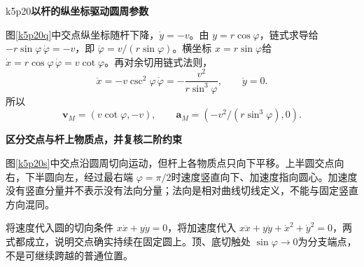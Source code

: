 \begin{drillsolution}{k5p20}\textbf{以杆的纵坐标驱动圆周参数}\par\nobreak
图\ref{k5p20q}中交点纵坐标随杆下降，$\dot y=-v$。由 $y=r\cos\varphi$，链式求导给 $-r\sin\varphi\,\dot\varphi=-v$，即 $\dot\varphi=v/(r\sin\varphi)$。横坐标 $x=r\sin\varphi$给 $\dot x=r\cos\varphi\,\dot\varphi=v\cot\varphi$。再对余切用链式法则，
\[\ddot x=-v\csc^2\varphi\,\dot\varphi
 =-\frac{v^2}{r\sin^3\varphi},\qquad\ddot y=0.\]
所以
\[\boxed{\bm v_M=(v\cot\varphi,-v)},\qquad\boxed{\bm a_M=(-v^2/(r\sin^3\varphi),0)}.\]



\par\medskip{}\noindent\textbf{区分交点与杆上物质点，并复核二阶约束}\par\nobreak
图\ref{k5p20s}中交点沿圆周切向运动，但杆上各物质点只向下平移。上半圆交点向右，下半圆向左，经过最右端 $\varphi=\pi/2$时速度竖直向下、加速度指向圆心。加速度没有竖直分量并不表示没有法向分量；法向是相对曲线切线定义，不能与固定竖直方向混同。

将速度代入圆的切向条件 $x\dot x+y\dot y=0$，将加速度代入 $x\ddot x+y\ddot y+\dot x^2+\dot y^2=0$，两式都成立，说明交点确实持续在固定圆上。顶、底切触处 $\sin\varphi\to0$为分支端点，不是可继续跨越的普通位置。\end{drillsolution}

